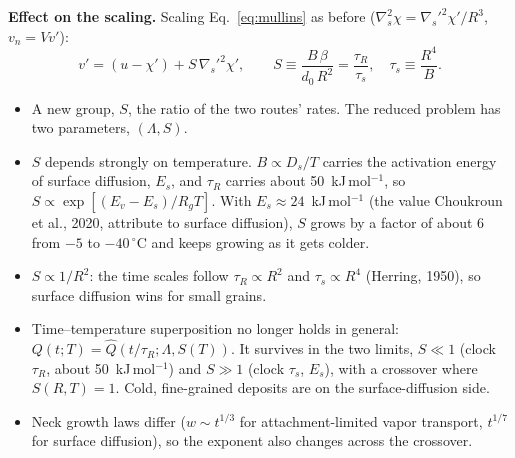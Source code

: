 \documentclass[11pt]{article}
\begin{document}
\textbf{Effect on the scaling.} Scaling Eq.~\eqref{eq:mullins} as before
($\nabla_s^{2}\chi = \nabla_s'^{2}\chi'/R^{3}$, $v_n = Vv'$):
\begin{equation}
v' = (u - \chi') + S\,\nabla_s'^{2}\chi' ,
\qquad
S \equiv \frac{B\,\beta}{d_0\,R^{2}} = \frac{\tau_{R}}{\tau_s},\quad \tau_s \equiv \frac{R^{4}}{B} .
\end{equation}
\begin{itemize}
\item A new group, $S$, the ratio of the two routes' rates. The reduced
  problem has two parameters, $(\Lambda, S)$.
\item $S$ depends strongly on temperature. $B \propto D_s/T$ carries the
  activation energy of surface diffusion, $E_s$, and $\tau_{R}$ carries about
  50~kJ\,mol$^{-1}$, so $S \propto \exp[(E_v - E_s)/R_gT]$. With $E_s
  \approx 24$~kJ\,mol$^{-1}$ (the value Choukroun et al., 2020, attribute to
  surface diffusion), $S$ grows by a factor of about 6 from $-5$ to
  $-40\,^{\circ}$C and keeps growing as it gets colder.
\item $S \propto 1/R^{2}$: the time scales follow $\tau_{R} \propto R^{2}$ and
  $\tau_s \propto R^{4}$ (Herring, 1950), so surface diffusion wins for
  small grains.
\item Time--temperature superposition no longer holds in general: $Q(t;T) =
  \widehat Q(t/\tau_{R};\Lambda,S(T))$. It survives in the two limits, $S \ll 1$
  (clock $\tau_{R}$, about 50~kJ\,mol$^{-1}$) and $S \gg 1$ (clock $\tau_s$,
  $E_s$), with a crossover where $S(R,T) = 1$. Cold, fine-grained deposits
  are on the surface-diffusion side.
\item Neck growth laws differ ($w \sim t^{1/3}$ for attachment-limited
  vapor transport, $t^{1/7}$ for surface diffusion), so the exponent also
  changes across the crossover.
\end{itemize}
\end{document}
